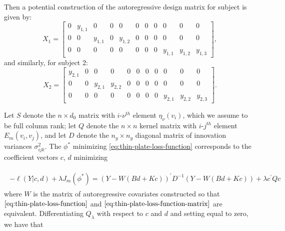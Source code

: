 Then a potential construction of the autoregressive design matrix for subject is given by:
\begin{equation}
X_1 =  \begin{bmatrix} 
0   & y_{1, 1}  &	0   	     &    0   &    0  	    &  0   &	 0   &	0   	& 	0   	&    0         & 	0  \\
0   &	0  	  &	y_{1, 1}  &    0   & y_{1, 2}   &  0   &	 0   &	0   	& 	0   	&    0         & 	0  \\
0   &	0   	  &	0    	     &    0   &  0   	    &  0   &	 0   &	0   	&  y_{1, 1}    & y_{1, 2}& y_{1, 3} 
\end{bmatrix},
\end{equation}
\noindent
and similarly, for subject 2:
\begin{equation}
X_2 =  \begin{bmatrix} 
y_{2, 1}   & 0  &	0   &    0   &  0   &  0   &	 0   &	0   	& 	0   	&    0   & 	0  \\
0   &	0   &	 y_{2, 1} & y_{2, 2}  & 0  &  0   &	 0   &	0   	& 	0   	&    0   & 	0  \\
0   &	0   &	0   &    0   &  0   &  0   &	 0   &	0   	&  y_{2, 1} & y_{2, 2}&y_{2, 3}
\end{bmatrix}.
\end{equation}

Let $S$ denote the $n \times d_0$ matrix with $i$-$\nu^{th}$ element $\eta_\nu\left(v_i\right)$, which we assume to be full column rank; let $Q$ denote the $n \times n$ kernel matrix with $i$-$j^{th}$ element $E_m\left(v_i, v_j\right)$, and let $D$ denote the $n_y \times n_y$ diagonal matrix of innovation variances $\sigma^2_{ijk}$. The $\phi^*$ minimizing \ref{eq:thin-plate-loss-function} corresponds to the coefficient vectors $c$, $d$ minimizing

\begin{align}
\begin{split} \label{eq:penalized-likelihood-vectorized} 
-\ell\left(Y \vert c,d\right) + \lambda J_m\left(\phi^*\right) = \left( Y - W \left( Bd + Kc \right) \right)^\prime D^{-1} \left( Y - W \left( Bd + Kc \right) \right) + \lambda c^\prime Q c 
\end{split}
\end{align} 
\bigskip
\noindent
 where $W$ is the matrix of autoregressive covariates constructed so that $\ref{eq:thin-plate-loss-function}$ and $\ref{eq:thin-plate-loss-function-matrix}$ are equivalent. 
\bigskip
Differentiating $Q_\lambda$ with respect to $c$ and $d$ and setting equal to zero, we have that 

